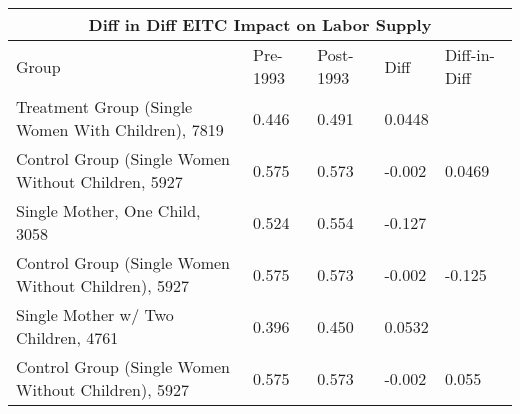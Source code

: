 

\begin{tabular}{ |p{2cm}||p{1cm}|p{1cm}|p{1cm}| p{1cm}|}
 \hline
 \multicolumn{5}{|c|}{Diff in Diff EITC Impact on Labor Supply} \\
 \hline
 Group  &Pre-1993&Post-1993 & Diff & Diff-in-Diff\\
 \hline
Treatment Group (Single Women With Children),  7819    &0.446 &0.491 &0.0448 & \\
\hline
Control Group (Single Women Without Children, 5927  & 0.575 & 0.573 & -0.002 & 0.0469 \\
\hline
Single Mother, One Child, 3058 &	0.524 &	0.554 & -0.127 &	\\
\hline
Control Group (Single Women Without Children),	5927 &	0.575 &	0.573 &	-0.002 &	-0.125 \\
\hline
Single Mother w/ Two Children, 4761 &	0.396 &	0.450 &	0.0532 &	\\
\hline
Control Group (Single Women Without Children), 5927 &	0.575 &	0.573 &	-0.002 &	0.055\\
\hline
\end{tabular}

